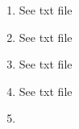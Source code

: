 \documentclass{4320hw}
\begin{document}

\maketitle

\begin{exercises}
\item
\begin{enumerate}
\item
See txt file

\item
See txt file

\item
See txt file

\item
See txt file

\item

\end{enumerate}

\end{exercises}
\end{document}
